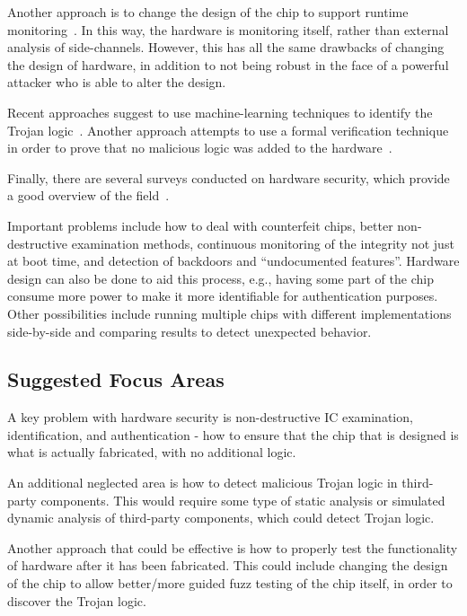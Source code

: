 \documentclass[11pt,letterpaper]{article}
\begin{document}
Another approach is to change the design of the chip to support
runtime monitoring~\cite{waksman2010}. In this way, the hardware
is monitoring itself, 
rather than external analysis of
side-channels. However, this has all the same drawbacks of changing
the design of hardware, in addition to not being robust in the face of
a powerful attacker who is able to alter the design. 

Recent approaches suggest to use machine-learning techniques to
identify the Trojan logic~\cite{haider2015}. Another approach attempts
to use a formal verification technique in order to prove that no
malicious logic was added to the hardware~\cite{guo2015}.

Finally, there are several surveys conducted on hardware security,
which provide a good overview of the field~\cite{wang2008,
  tehranipoor2010, guin2014, guin2014a, guin2014b}.

Important problems include how to deal with counterfeit chips, better
non-destructive examination methods, continuous monitoring of the
integrity not just at boot time, and detection of backdoors and 
``undocumented features''.  Hardware design can also be done to
aid this process, e.g., having some part of the chip consume more power
to make it more identifiable for authentication purposes.  Other
possibilities include running multiple chips with different
implementations side-by-side and comparing results to detect unexpected
behavior.

\subsection{Suggested Focus Areas}

A key problem with hardware security is non-destructive IC
examination, identification, and authentication - how to ensure that
the chip that is designed is what is actually fabricated, with no
additional logic.

An additional neglected area is how to detect malicious Trojan logic
in third-party components. This would require some type of static
analysis or simulated dynamic analysis of third-party components,
which could detect Trojan logic.

Another approach that could be effective is how to properly test the
functionality of hardware after it has been fabricated. This could
include changing the design of the chip to allow better/more guided
fuzz testing of the chip itself, in order to discover the Trojan
logic.
\end{document}

